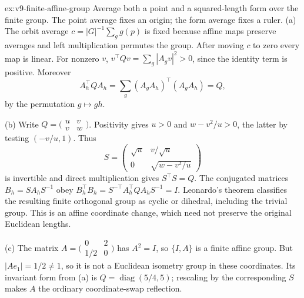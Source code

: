 \begin{solution}{ex:v9-finite-affine-group}
\idea Average both a point and a squared-length form over the finite group. The point average fixes an origin; the form average fixes a ruler.
\writeup (a) The orbit average $c=|G|^{-1}\sum_g g(p)$ is fixed because affine maps preserve averages and left multiplication permutes the group. After moving $c$ to zero every map is linear. For nonzero $v$,
$v^\top Qv=\sum_g|A_gv|^2>0$, since the identity term is positive. Moreover
\[
A_h^\top QA_h=\sum_g(A_gA_h)^\top(A_gA_h)=Q,
\]
by the permutation $g\mapsto gh$.

(b) Write $Q=\bigl(\begin{smallmatrix}u&v\\v&w\end{smallmatrix}\bigr)$. Positivity gives $u>0$ and $w-v^2/u>0$, the latter by testing $(-v/u,1)$. Thus
\[
S=\begin{pmatrix}\sqrt u&v/\sqrt u\\0&\sqrt{w-v^2/u}\end{pmatrix}
\]
is invertible and direct multiplication gives $S^\top S=Q$. The conjugated matrices $B_h=SA_hS^{-1}$ obey
$B_h^\top B_h=S^{-\top}A_h^\top QA_hS^{-1}=I$. Leonardo's theorem classifies the resulting finite orthogonal group as cyclic or dihedral, including the trivial group. This is an affine coordinate change, which need not preserve the original Euclidean lengths.

(c) The matrix $A=\bigl(\begin{smallmatrix}0&2\\1/2&0\end{smallmatrix}\bigr)$ has $A^2=I$, so $\{I,A\}$ is a finite affine group. But $|Ae_1|=1/2\ne1$, so it is not a Euclidean isometry group in these coordinates. Its invariant form from (a) is $Q=\operatorname{diag}(5/4,5)$; rescaling by the corresponding $S$ makes $A$ the ordinary coordinate-swap reflection.
\end{solution}


